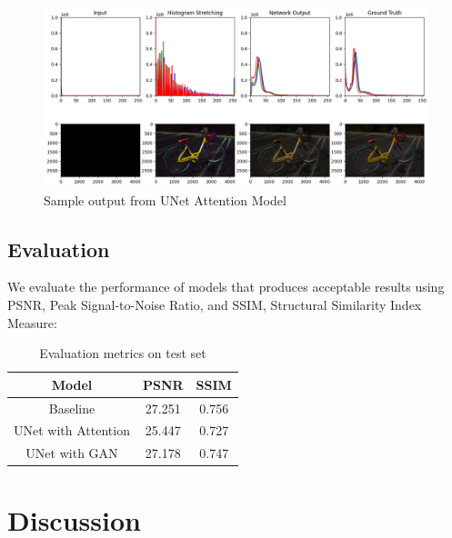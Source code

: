 \documentclass{article}
\begin{document}
\begin{figure}[H]
  \centering
  \includegraphics[width=\textwidth]{Result1UnetAttn.png}
  \caption{Sample output from UNet Attention Model}
\end{figure}



\subsection{Evaluation}
We evaluate the performance of models that produces acceptable results using PSNR, Peak Signal-to-Noise Ratio, and SSIM, Structural Similarity Index Measure: 
\begin{table}[H]
    \centering
    \begin{tabular}{|c|c|c|}
        \hline
        Model & PSNR & SSIM\\
        \hline
        Baseline & 27.251 & 0.756 \\
        \hline
        UNet with Attention & 25.447 & 0.727\\
        \hline
        UNet with GAN & 27.178 & 0.747\\
        \hline
    \end{tabular}
    \caption{Evaluation metrics on test set}
    \label{tab:my_label}
\end{table}

\section{Discussion}
\end{document}
